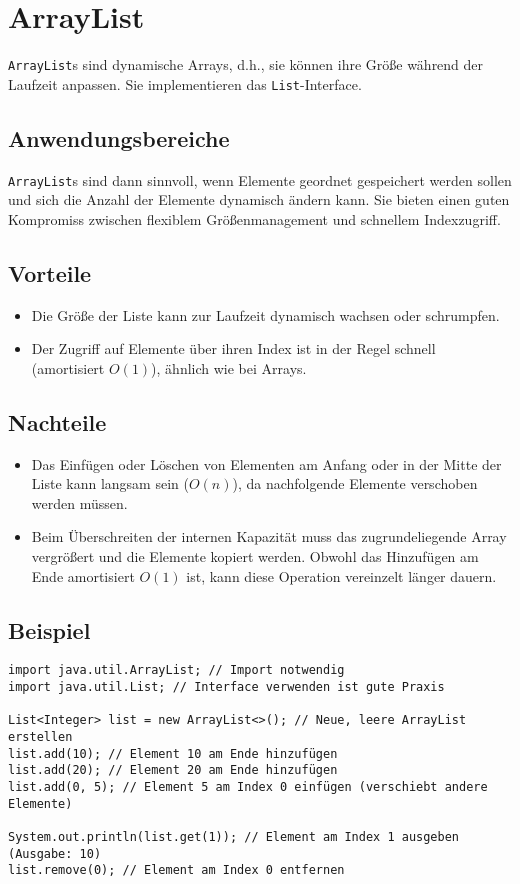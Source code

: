 \section{ArrayList}
\texttt{ArrayList}s sind dynamische Arrays, d.h., sie können ihre Größe während der Laufzeit anpassen. Sie implementieren das \texttt{List}-Interface.

\subsection{Anwendungsbereiche}
\texttt{ArrayList}s sind dann sinnvoll, wenn Elemente geordnet gespeichert werden sollen und sich die Anzahl der Elemente dynamisch ändern kann. Sie bieten einen guten Kompromiss zwischen flexiblem Größenmanagement und schnellem Indexzugriff.

\subsection{Vorteile}
\begin{itemize}
    \item Die Größe der Liste kann zur Laufzeit dynamisch wachsen oder schrumpfen.
    \item Der Zugriff auf Elemente über ihren Index ist in der Regel schnell (amortisiert $O(1)$), ähnlich wie bei Arrays.
\end{itemize}

\subsection{Nachteile}
\begin{itemize}
    \item Das Einfügen oder Löschen von Elementen am Anfang oder in der Mitte der Liste kann langsam sein ($O(n)$), da nachfolgende Elemente verschoben werden müssen.
    \item Beim Überschreiten der internen Kapazität muss das zugrundeliegende Array vergrößert und die Elemente kopiert werden. Obwohl das Hinzufügen am Ende amortisiert $O(1)$ ist, kann diese Operation vereinzelt länger dauern.
\end{itemize}

\subsection{Beispiel}
\begin{lstlisting}[caption={Beispiel für die Verwendung einer ArrayList in Java}, label=lst:arrayListExample]
import java.util.ArrayList; // Import notwendig
import java.util.List; // Interface verwenden ist gute Praxis

List<Integer> list = new ArrayList<>(); // Neue, leere ArrayList erstellen
list.add(10); // Element 10 am Ende hinzufügen
list.add(20); // Element 20 am Ende hinzufügen
list.add(0, 5); // Element 5 am Index 0 einfügen (verschiebt andere Elemente)

System.out.println(list.get(1)); // Element am Index 1 ausgeben (Ausgabe: 10)
list.remove(0); // Element am Index 0 entfernen
\end{lstlisting}


